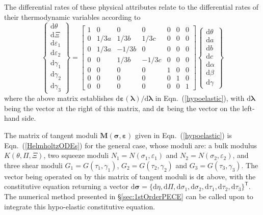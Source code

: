The differential rates of these physical attributes relate to the differential rates of their thermo\-dynamic variables according to
\begin{equation}
    \left\{ \begin{matrix}
    \mathrm{d} \theta \\ \mathrm{d} \Xi \\ \mathrm{d} \varepsilon_1 \\
    \mathrm{d} \varepsilon_2 \\ \mathrm{d} \gamma_1 \\ \mathrm{d} \gamma_2 \\
    \mathrm{d} \gamma_3
    \end{matrix} \right\} = \begin{bmatrix}
    1 & 0 & 0 & 0 & 0 & 0 & 0 \\
    0 & 1/3a & 1/3b & 1/3c & 0 & 0 & 0 \\
    0 & 1/3a & -1/3b & 0 & 0 & 0 & 0 \\
    0 & 0 & 1/3b & -1/3c & 0 & 0 & 0 \\
    0 & 0 & 0 & 0 & 1 & 0 & 0 \\
    0 & 0 & 0 & 0 & 0 & 1 & 0 \\
    0 & 0 & 0 & 0 & 0 & 0 & 1
    \end{bmatrix} \left\{ \begin{matrix}
    \mathrm{d} \theta \\ \mathrm{d} a \\ \mathrm{d} b \\ \mathrm{d} c \\
    \mathrm{d} \alpha \\ \mathrm{d} \beta \\ \mathrm{d} \gamma
    \end{matrix} \right\}
\end{equation}
where the above matrix establishes $\mathrm{d} \boldsymbol{\varepsilon} ( \boldsymbol{\lambda} ) / \mathrm{d} \boldsymbol{\lambda}$ in Eqn.~(\ref{hypoelastic}), with $\mathrm{d} \boldsymbol{\lambda}$ being the vector at the right of this matrix, and $\mathrm{d} \boldsymbol{\varepsilon}$ being the vector on the left-hand side. 

The matrix of tangent moduli $\mathbf{M} ( \boldsymbol{\sigma} , \boldsymbol{\varepsilon} )$ given in Eqn.~(\ref{hypoelastic}) is Eqn.~(\ref{HelmholtzODEs}) for the general case, whose moduli are: a bulk modulus $K(\theta , \Pi , \Xi)$, two squeeze moduli $N_1 = N ( \sigma_1 , \varepsilon_1 )$ and $N_2 = N ( \sigma_2 , \varepsilon_2 )$, and three shear moduli $G_1 = G ( \tau_1 , \gamma_1 )$, $G_2 = G ( \tau_2 , \gamma_2 )$ and $G_3 = G ( \tau_3 , \gamma_3 )$.  The vector being operated on by this matrix of tangent moduli is $\mathrm{d} \boldsymbol{\varepsilon}$ above, with the constitutive equation returning a vector $\mathrm{d} \boldsymbol{\sigma} = \{ \mathrm{d} \eta , \mathrm{d} \Pi , \mathrm{d} \sigma_1 , \mathrm{d} \sigma_2 , \mathrm{d} \tau_1 , \mathrm{d} \tau_2 , \mathrm{d} \tau_3 \}^{\mathsf{T}}$.  The numerical method presented in \S\ref{sec:1stOrderPECE} can be called upon to integrate this hypo-elastic constitutive equation.  

